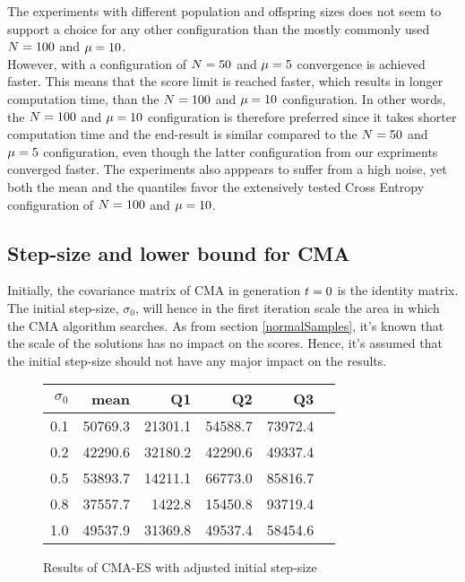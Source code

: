 The experiments with different population and offspring sizes
does not seem to support a choice for any other configuration 
than the mostly commonly used 
$N = 100$ and $\mu = 10$. \\
However, with a configuration of $N = 50$ and $\mu = 5$ convergence
is achieved faster. This means that the score limit is reached faster, which
results in longer computation time, than the $N = 100$ and $\mu = 10$
configuration. In other words, the $N = 100$ and $\mu = 10$ configuration 
is therefore preferred since it takes shorter computation time and the end-result is similar compared
to the $N = 50$ and $\mu = 5$ configuration, even though the latter 
configuration from our expriments converged faster. The experiments also apppears
to suffer from a high noise, yet both the mean and the quantiles favor the 
extensively tested Cross Entropy configuration of $N = 100$ and $\mu = 10$.


\subsection{Step-size and lower bound for CMA}
Initially, the covariance matrix of CMA in generation $t = 0$
is the identity matrix. The initial step-size, $\sigma_0$, will hence in 
the first iteration scale the area in which the CMA algorithm searches.
As from section \ref{normalSamples}, it's known that the scale of the 
solutions has no impact on the scores. Hence, it's assumed that the initial 
step-size should not have any major impact on the results.

\begin{figure}[H]
\centering
\begin{tabular}{r | r r r r r}
$\sigma_0$ & mean & Q1 & Q2 & Q3\\
\hline
0.1 & 50769.3 & 21301.1 & 54588.7 & 73972.4\\
0.2 & 42290.6 & 32180.2 & 42290.6 & 49337.4\\
0.5 & 53893.7 & 14211.1 & 66773.0 & 85816.7\\
0.8 & 37557.7 & 1422.8  & 15450.8 & 93719.4\\
1.0 & 49537.9 & 31369.8 & 49537.4 & 58454.6
\end{tabular}
\caption{Results of CMA-ES with adjusted initial step-size \label{CMAInitialSigmaConfigTest}}
\end{figure}

